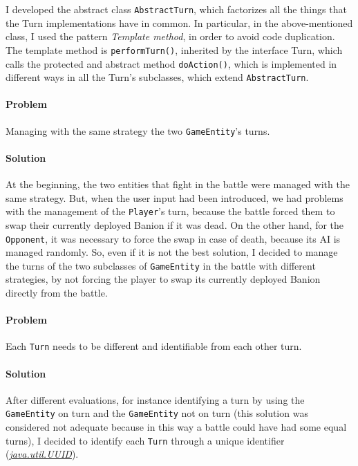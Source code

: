 \documentclass[12pt, a4paper]{report}
\theoremstyle{definition}
\begin{document}
            I developed the abstract class \verb|AbstractTurn|, which factorizes all the things that the Turn implementations have in common.
            In particular, in the above-mentioned class, I used the pattern \emph{Template method}, in order to avoid code duplication.
            The template method is \verb|performTurn()|, inherited by the interface Turn, which calls the protected and abstract 
            method \verb|doAction()|, which is implemented in different ways in all the Turn's subclasses, which extend \verb|AbstractTurn|.

            \paragraph{Problem}

            Managing with the same strategy the two \verb|GameEntity|'s turns.

            \paragraph{Solution}

            At the beginning, the two entities that fight in the battle were managed with the same strategy. But, when the user input had
            been introduced, we had problems with the management of the \verb|Player|'s turn, because the battle forced them to swap their
            currently deployed Banion if it was dead. On the other hand, for the \verb|Opponent|, it was necessary to force the swap 
            in case of death, because its AI is managed randomly. So, even if it is not the best solution, I decided to manage the turns 
            of the two subclasses of \verb|GameEntity| in the battle with different strategies, by not forcing the player to swap its currently 
            deployed Banion directly from the battle.

            \paragraph{Problem}

            Each \verb|Turn| needs to be different and identifiable from each other turn.

            \paragraph{Solution}

            After different evaluations, for instance identifying a turn by using the \verb|GameEntity| on turn and the \verb|GameEntity|
            not on turn (this solution was considered not adequate because in this way a battle could have had some equal turns),
            I decided to identify each \verb|Turn| through a unique identifier
            (\href{https://docs.oracle.com/en/java/javase/17/docs/api/java.base/java/util/UUID.html}{\textit{java.util.UUID}}).
\end{document}
